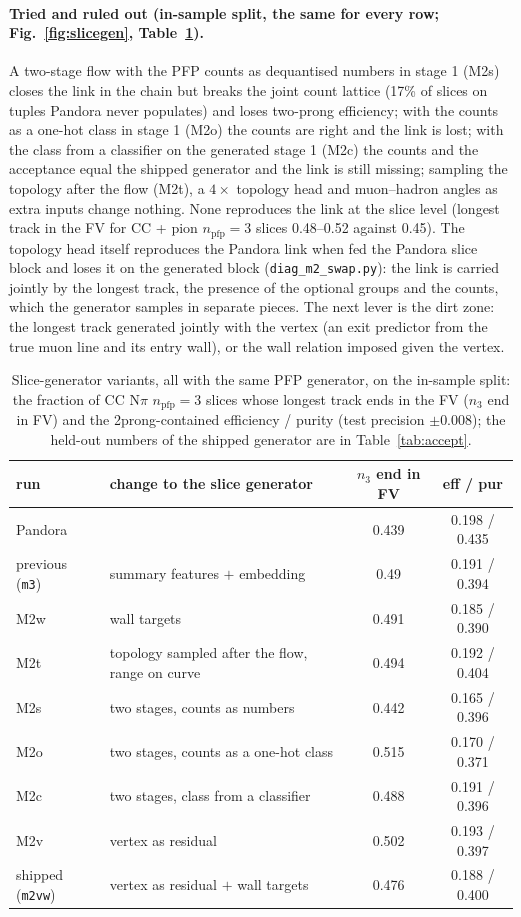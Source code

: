 \documentclass[11pt]{article}
\newcommand{\real}{Pandora}
\begin{document}
\paragraph{Tried and ruled out (in-sample split, the same for every row; Fig.~\ref{fig:slicegen},
Table~\ref{tab:variants}).} A two-stage flow with the PFP counts as dequantised numbers in stage 1 (M2s) closes
the link in the chain but breaks the joint count lattice (17\% of slices on tuples \real{} never populates) and
loses two-prong efficiency; with the counts as a one-hot class in stage 1 (M2o) the counts are right and the link
is lost; with the class from a classifier on the generated stage 1 (M2c) the counts and the acceptance equal the
shipped generator and the link is still missing; sampling the topology after the flow (M2t), a $4\times$ topology
head and muon--hadron angles as extra inputs change nothing. None reproduces the link at the slice level (longest
track in the FV for CC + pion $n_\mathrm{pfp}=3$ slices 0.48--0.52 against 0.45). The topology head itself
reproduces the \real{} link when fed the \real{} slice block and loses it on the generated block
(\texttt{diag\_m2\_swap.py}): the link is carried jointly by the longest track, the presence of the optional
groups and the counts, which the generator samples in separate pieces. The next lever is the dirt zone: the
longest track generated jointly with the vertex (an exit predictor from the true muon line and its entry wall),
or the wall relation imposed given the vertex.

\begin{table}[h]\centering\small
\begin{tabular}{llcc}\toprule
run & change to the slice generator & $n_3$ end in FV & eff / pur \\\midrule
\real{} & & 0.439 & 0.198 / 0.435 \\
previous (\texttt{m3}) & summary features $+$ embedding & 0.49 & 0.191 / 0.394 \\
M2w & wall targets & 0.491 & 0.185 / 0.390 \\
M2t & topology sampled after the flow, range on curve & 0.494 & 0.192 / 0.404 \\
M2s & two stages, counts as numbers & 0.442 & 0.165 / 0.396 \\
M2o & two stages, counts as a one-hot class & 0.515 & 0.170 / 0.371 \\
M2c & two stages, class from a classifier & 0.488 & 0.191 / 0.396 \\
M2v & vertex as residual & 0.502 & 0.193 / 0.397 \\
shipped (\texttt{m2vw}) & vertex as residual $+$ wall targets & 0.476 & 0.188 / 0.400 \\\bottomrule
\end{tabular}
\caption{Slice-generator variants, all with the same PFP generator, on the in-sample split: the fraction of CC N$\pi$
$n_\mathrm{pfp}=3$ slices whose longest track ends in the FV ($n_3$ end in FV) and the 2prong-contained efficiency / purity
(test precision $\pm0.008$); the held-out numbers of the shipped generator are in Table~\ref{tab:accept}.}\label{tab:variants}\end{table}
\end{document}
